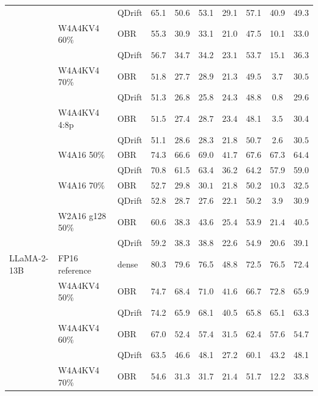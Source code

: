 \begin{tabular}{lllccccccc}
 &  & QDrift & 65.1 & 50.6 & 53.1 & 29.1 & 57.1 & 40.9 & 49.3 \\
 & W4A4KV4 60\% & OBR & 55.3 & 30.9 & 33.1 & 21.0 & 47.5 & 10.1 & 33.0 \\
 &  & QDrift & $\mathbf{56.7}$ & $\mathbf{34.7}$ & $\mathbf{34.2}$ & $\mathbf{23.1}$ & $\mathbf{53.7}$ & $\mathbf{15.1}$ & $\mathbf{36.3}$ \\
 & W4A4KV4 70\% & OBR & $\mathbf{51.8}$ & $\mathbf{27.7}$ & $\mathbf{28.9}$ & 21.3 & $\mathbf{49.5}$ & $\mathbf{3.7}$ & $\mathbf{30.5}$ \\
 &  & QDrift & 51.3 & 26.8 & 25.8 & $\mathbf{24.3}$ & 48.8 & 0.8 & 29.6 \\
 & W4A4KV4 4:8p & OBR & $\mathbf{51.5}$ & 27.4 & $\mathbf{28.7}$ & $\mathbf{23.4}$ & 48.1 & $\mathbf{3.5}$ & 30.4 \\
 &  & QDrift & 51.1 & $\mathbf{28.6}$ & 28.3 & 21.8 & $\mathbf{50.7}$ & 2.6 & $\mathbf{30.5}$ \\
 & W4A16 50\% & OBR & $\mathbf{74.3}$ & $\mathbf{66.6}$ & $\mathbf{69.0}$ & $\mathbf{41.7}$ & $\mathbf{67.6}$ & $\mathbf{67.3}$ & $\mathbf{64.4}$ \\
 &  & QDrift & 70.8 & 61.5 & 63.4 & 36.2 & 64.2 & 57.9 & 59.0 \\
 & W4A16 70\% & OBR & 52.7 & $\mathbf{29.8}$ & $\mathbf{30.1}$ & 21.8 & 50.2 & $\mathbf{10.3}$ & $\mathbf{32.5}$ \\
 &  & QDrift & $\mathbf{52.8}$ & 28.7 & 27.6 & $\mathbf{22.1}$ & 50.2 & 3.9 & 30.9 \\
 & W2A16 g128 50\% & OBR & $\mathbf{60.6}$ & 38.3 & $\mathbf{43.6}$ & $\mathbf{25.4}$ & 53.9 & $\mathbf{21.4}$ & $\mathbf{40.5}$ \\
 &  & QDrift & 59.2 & 38.3 & 38.8 & 22.6 & $\mathbf{54.9}$ & 20.6 & 39.1 \\
\midrule
LLaMA-2-13B & FP16 reference & dense & 80.3 & 79.6 & 76.5 & 48.8 & 72.5 & 76.5 & 72.4 \\
 & W4A4KV4 50\% & OBR & $\mathbf{74.7}$ & $\mathbf{68.4}$ & $\mathbf{71.0}$ & $\mathbf{41.6}$ & $\mathbf{66.7}$ & $\mathbf{72.8}$ & $\mathbf{65.9}$ \\
 &  & QDrift & 74.2 & 65.9 & 68.1 & 40.5 & 65.8 & 65.1 & 63.3 \\
 & W4A4KV4 60\% & OBR & $\mathbf{67.0}$ & $\mathbf{52.4}$ & $\mathbf{57.4}$ & $\mathbf{31.5}$ & $\mathbf{62.4}$ & $\mathbf{57.6}$ & $\mathbf{54.7}$ \\
 &  & QDrift & 63.5 & 46.6 & 48.1 & 27.2 & 60.1 & 43.2 & 48.1 \\
 & W4A4KV4 70\% & OBR & 54.6 & $\mathbf{31.3}$ & 31.7 & $\mathbf{21.4}$ & 51.7 & 12.2 & 33.8 \\

\end{tabular}
